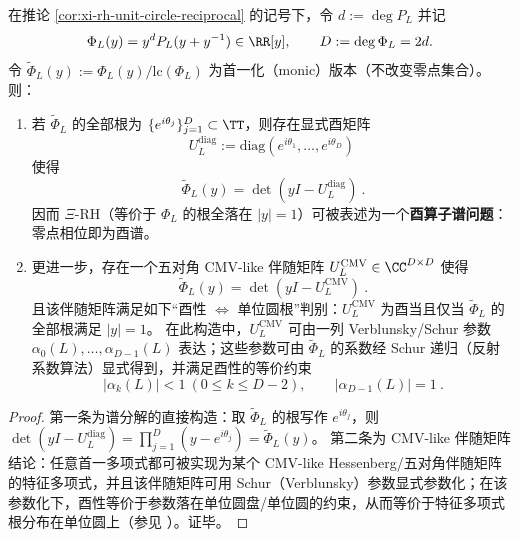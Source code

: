 \begin{proposition}\label{prop:xi-hilbert-polya-cmv}
在推论 \ref{cor:xi-rh-unit-circle-reciprocal} 的记号下，令 \(d:=\deg P_L\) 并记
\[
\Phi_L(y)=y^dP_L(y+y^{-1})\in\RR[y],
\qquad
D:=\deg \Phi_L=2d.
\]
令 \(\widetilde\Phi_L(y):=\Phi_L(y)/\mathrm{lc}(\Phi_L)\) 为首一化（monic）版本（不改变零点集合）。
则：
\begin{enumerate}
  \item 若 \(\widetilde\Phi_L\) 的全部根为 \(\{e^{i\theta_j}\}_{j=1}^{D}\subset\TT\)，则存在显式酉矩阵
  \[
  U_L^{\mathrm{diag}}:=\mathrm{diag}(e^{i\theta_1},\dots,e^{i\theta_D})
  \]
  使得
  \[
  \boxed{\ \widetilde\Phi_L(y)=\det(yI-U_L^{\mathrm{diag}})\ }.
  \]
  因而 \(\Xi\)-RH（等价于 \(\Phi_L\) 的根全落在 \(|y|=1\)）可被表述为一个\textbf{酉算子谱问题}：零点相位即为酉谱。
  \item 更进一步，存在一个五对角 CMV-like 伴随矩阵 \(U_L^{\mathrm{CMV}}\in\CC^{D\times D}\) 使得
  \[
  \boxed{\ \widetilde\Phi_L(y)=\det(yI-U_L^{\mathrm{CMV}})\ }.
  \]
  且该伴随矩阵满足如下“酉性 \(\Leftrightarrow\) 单位圆根”判别：\(U_L^{\mathrm{CMV}}\) 为酉当且仅当 \(\widetilde\Phi_L\) 的全部根满足 \(|y|=1\)。
  在此构造中，\(U_L^{\mathrm{CMV}}\) 可由一列 Verblunsky/Schur 参数 \(\alpha_0(L),\dots,\alpha_{D-1}(L)\) 表达；这些参数可由 \(\widetilde\Phi_L\) 的系数经 Schur 递归（反射系数算法）显式得到，并满足酉性的等价约束
  \[
  \boxed{\ |\alpha_k(L)|<1\ (0\le k\le D-2),\qquad |\alpha_{D-1}(L)|=1\ }.
  \]
\end{enumerate}
\end{proposition}
\begin{proof}
第一条为谱分解的直接构造：取 \(\widetilde\Phi_L\) 的根写作 \(e^{i\theta_j}\)，则 \(\det(yI-U_L^{\mathrm{diag}})=\prod_{j=1}^{D}(y-e^{i\theta_j})=\widetilde\Phi_L(y)\)。
第二条为 CMV-like 伴随矩阵结论：任意首一多项式都可被实现为某个 CMV-like Hessenberg/五对角伴随矩阵的特征多项式，并且该伴随矩阵可用 Schur（Verblunsky）参数显式参数化；在该参数化下，酉性等价于参数落在单位圆盘/单位圆的约束，从而等价于特征多项式根分布在单位圆上（参见 \cite{CanteroMoralVelazquez2003CMV,Simon2005OPUC1,BevilacquaDelCorsoGemignani2015CMVCompanion}）。证毕。
\end{proof}

